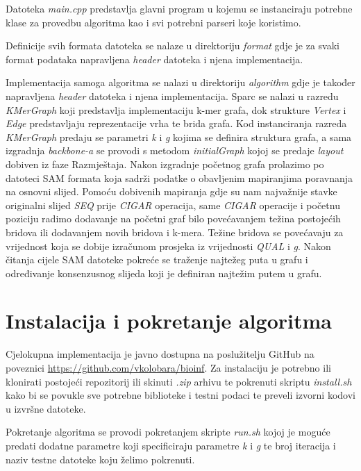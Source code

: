 \documentclass[times, utf8, seminar, numeric]{fer}
\begin{document}
Datoteka \emph{main.cpp} predstavlja glavni program u kojemu se instanciraju potrebne klase za provedbu algoritma kao i svi potrebni parseri koje koristimo.

Definicije svih formata datoteka se nalaze u direktoriju \emph{format} gdje je za svaki format podataka napravljena \emph{header} datoteka i njena implementacija.

Implementacija samoga algoritma se nalazi u direktoriju \emph{algorithm} gdje je također napravljena \emph{header} datoteka i njena implementacija. Sparc se nalazi u razredu \emph{KMerGraph} koji predstavlja implementaciju k-mer grafa, dok strukture \emph{Vertex} i \emph{Edge} predstavljaju reprezentacije vrha te brida grafa. Kod instanciranja razreda \emph{KMerGraph} predaju se parametri \emph{k} i \emph{g} kojima se definira struktura grafa, a sama izgradnja \emph{backbone-a} se provodi s metodom \emph{initialGraph} kojoj se predaje \emph{layout} dobiven iz faze Razmještaja. Nakon izgradnje početnog grafa prolazimo po datoteci SAM formata koja sadrži podatke o obavljenim mapiranjima poravnanja na osnovni slijed. Pomoću dobivenih mapiranja gdje su nam najvažnije stavke originalni slijed \emph{SEQ} prije \emph{CIGAR} operacija, same \emph{CIGAR} operacije i početnu poziciju radimo dodavanje na početni graf bilo povećavanjem težina postojećih bridova ili dodavanjem novih bridova i k-mera. Težine bridova se povećavaju za vrijednost koja se dobije izračunom prosjeka iz vrijednosti \emph{QUAL} i \emph{g}. Nakon čitanja cijele SAM datoteke pokreće se traženje najtežeg puta u grafu i određivanje konsenzusnog slijeda koji je definiran najtežim putem u grafu.

\section{Instalacija i pokretanje algoritma}
Cjelokupna implementacija je javno dostupna na poslužitelju GitHub na poveznici \url{https://github.com/vkolobara/bioinf}. Za instalaciju je potrebno ili klonirati postojeći repozitorij ili skinuti \emph{.zip} arhivu te pokrenuti skriptu \emph{install.sh} kako bi se povukle sve potrebne biblioteke i testni podaci te preveli izvorni kodovi u izvršne datoteke. 

Pokretanje algoritma se provodi pokretanjem skripte \emph{run.sh} kojoj je moguće predati dodatne parametre koji specificiraju parametre \emph{k} i \emph{g} te broj iteracija i naziv testne datoteke koju želimo pokrenuti.

\end{document}
